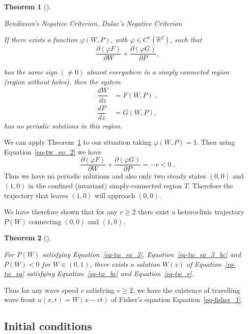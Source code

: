 \documentclass[
  letterpaper,
  DIV=11,
  numbers=noendperiod]{scrreprt}
\theoremstyle{plain}
\theoremstyle{definition}
\theoremstyle{plain}
\newtheorem{theorem}{Theorem}[chapter]
\theoremstyle{remark}
\begin{document}
\begin{theorem}[]\protect\hypertarget{thm-bendixson}{}\label{thm-bendixson}

Bendixson's Negative Criterion, Dulac's Negative Criterion

If there exists a function \(\varphi(W,P)\), with
\(\varphi \in C^1(\mathbb R^2)\), such that \[
 \frac{\partial(\varphi F )}{\partial W} +  \frac{\partial(\varphi G )}{\partial P},
\]

has the same sign \((\neq 0)\) almost everywhere in a simply connected
region (region without holes), then the system \[
 \begin{aligned}
 \dfrac{ dW}{dz} &= F(W,P) \; , 
 \\   \dfrac{dP}{dz} &= G(W,P),
\end{aligned}
\] has no periodic solutions in this region.

\end{theorem}

We can apply Theorem~\ref{thm-bendixson} to our situation taking
\(\varphi(W,P) = 1\). Then using Equation~\ref{eq-tw_eq_2} we have \[
 \frac{\partial(\varphi F )}{\partial W} +  \frac{\partial(\varphi G )}{\partial P} = - v < 0\; .
\] Thus we have no periodic solutions and also only two steady states
\((0,0)\) and \((1,0)\) in the confined (invariant) simply-connected
region \(T\). Therefore the trajectory that leaves \((1,0)\) will
approach \((0,0)\).

We have therefore shown that for any \(v\geq 2\) there exist a
heteroclinic trajectory \(P(W)\) connecting \((0,0)\) and \((1,0)\).

\begin{theorem}[]\protect\hypertarget{thm-trwaveexistence}{}\label{thm-trwaveexistence}

For \(P(W)\) satisfying Equation~\ref{eq-tw_eq_3},
Equation~\ref{eq-tw_eq_3_bc} and \(P(W) < 0\) for \(W \in (0,1)\), there
exists a solution \(W(z)\) of Equation~\ref{eq-tw_eq} satisfying
Equation~\ref{eq-tw_bc} and Equation~\ref{eq-tw_r}.

\end{theorem}

Thus for any wave speed \(v\) satisfying \(v \geq 2\), we have the
existence of travelling wave front \(u(x,t)= W(x- vt)\) of Fisher's
equation Equation~\ref{eq-fisher_1}.

\hypertarget{initial-conditions-1}{%
\subsection{Initial conditions}\label{initial-conditions-1}}
\end{document}
